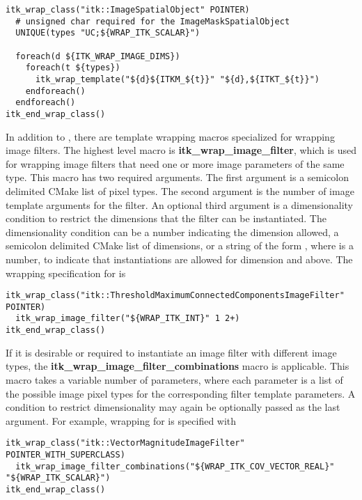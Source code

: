 \begin{verbatim}
itk_wrap_class("itk::ImageSpatialObject" POINTER)
  # unsigned char required for the ImageMaskSpatialObject
  UNIQUE(types "UC;${WRAP_ITK_SCALAR}")

  foreach(d ${ITK_WRAP_IMAGE_DIMS})
    foreach(t ${types})
      itk_wrap_template("${d}${ITKM_${t}}" "${d},${ITKT_${t}}")
    endforeach()
  endforeach()
itk_end_wrap_class()
\end{verbatim}


In addition to , there are template wrapping macros
specialized for wrapping image filters. The highest level macro is
\textbf{itk\_wrap\_image\_filter}, which is used for wrapping image filters
that need one or more image parameters of the same type. This macro has two
required arguments. The first argument is a semicolon delimited CMake list of
pixel types. The second argument is the number of image template arguments for
the filter. An optional third argument is a dimensionality condition to
restrict the dimensions that the filter can be instantiated. The
dimensionality condition can be a number indicating the dimension
allowed, a semicolon delimited CMake list of dimensions, or a string of the
form , where  is a number, to indicate that instantiations
are allowed for dimension  and above. The wrapping specification for
 is

\begin{verbatim}
itk_wrap_class("itk::ThresholdMaximumConnectedComponentsImageFilter" POINTER)
  itk_wrap_image_filter("${WRAP_ITK_INT}" 1 2+)
itk_end_wrap_class()
\end{verbatim}

If it is desirable or required to instantiate an image filter with different
image types, the \textbf{itk\_wrap\_image\_filter\_combinations} macro is
applicable. This macro takes a variable number of parameters, where each
parameter is a list of the possible image pixel types for the corresponding
filter
template parameters. A condition to restrict dimensionality may again be
optionally passed as the last argument. For example, wrapping for
 is specified with

\begin{verbatim}
itk_wrap_class("itk::VectorMagnitudeImageFilter" POINTER_WITH_SUPERCLASS)
  itk_wrap_image_filter_combinations("${WRAP_ITK_COV_VECTOR_REAL}" "${WRAP_ITK_SCALAR}")
itk_end_wrap_class()
\end{verbatim}


